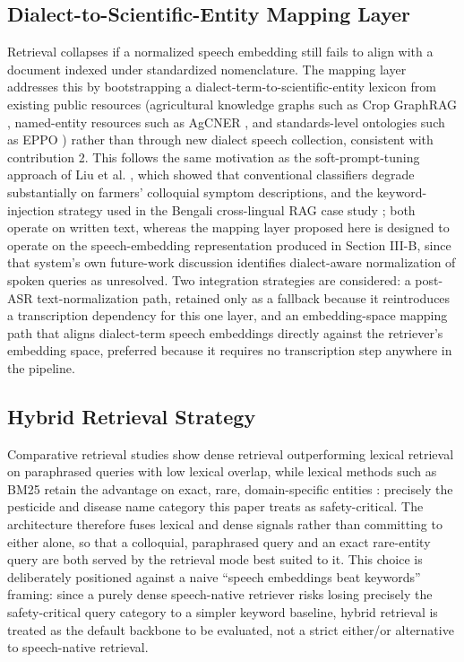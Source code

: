 \documentclass[conference]{IEEEtran}
\begin{document}
\subsection{Dialect-to-Scientific-Entity Mapping Layer}
Retrieval collapses if a normalized speech embedding still fails to align with a document indexed under standardized nomenclature. The mapping layer addresses this by bootstrapping a dialect-term-to-scientific-entity lexicon from existing public resources (agricultural knowledge graphs such as Crop GraphRAG \cite{wu2026cropgraphrag}, named-entity resources such as AgCNER \cite{yao2024agcner}, and standards-level ontologies such as EPPO \cite{kgeditorial2023}) rather than through new dialect speech collection, consistent with contribution 2. This follows the same motivation as the soft-prompt-tuning approach of Liu et al. \cite{liu2025colloquialpest}, which showed that conventional classifiers degrade substantially on farmers' colloquial symptom descriptions, and the keyword-injection strategy used in the Bengali cross-lingual RAG case study \cite{hossain2026bengalirag}; both operate on written text, whereas the mapping layer proposed here is designed to operate on the speech-embedding representation produced in Section III-B, since that system's own future-work discussion identifies dialect-aware normalization of spoken queries as unresolved. Two integration strategies are considered: a post-ASR text-normalization path, retained only as a fallback because it reintroduces a transcription dependency for this one layer, and an embedding-space mapping path that aligns dialect-term speech embeddings directly against the retriever's embedding space, preferred because it requires no transcription step anywhere in the pipeline.

\subsection{Hybrid Retrieval Strategy}
Comparative retrieval studies show dense retrieval outperforming lexical retrieval on paraphrased queries with low lexical overlap, while lexical methods such as BM25 retain the advantage on exact, rare, domain-specific entities \cite{sultania2024hybridsearch}: precisely the pesticide and disease name category this paper treats as safety-critical. The architecture therefore fuses lexical and dense signals rather than committing to either alone, so that a colloquial, paraphrased query and an exact rare-entity query are both served by the retrieval mode best suited to it. This choice is deliberately positioned against a naive ``speech embeddings beat keywords'' framing: since a purely dense speech-native retriever risks losing precisely the safety-critical query category to a simpler keyword baseline, hybrid retrieval is treated as the default backbone to be evaluated, not a strict either/or alternative to speech-native retrieval.
\end{document}
